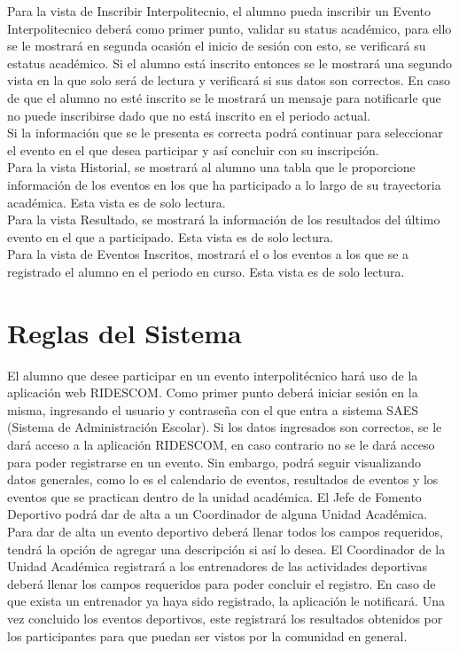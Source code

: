 	Para la vista de Inscribir Interpolitecnio, el alumno pueda inscribir un Evento Interpolitecnico deberá como primer punto, validar su status académico, para ello se le mostrará en segunda ocasión el inicio de sesión con esto, se verificará su estatus académico. Si el alumno está inscrito entonces se le mostrará una segundo vista en la que solo será de lectura y verificará si sus datos son correctos. En caso de que el alumno no esté inscrito se le mostrará un mensaje para notificarle que no puede inscribirse dado que no está inscrito en el periodo actual. \\
	Si la información que se le presenta es correcta podrá continuar para seleccionar el evento en el que desea participar y así concluir con su inscripción. \\
	
	Para la vista Historial, se mostrará al alumno una tabla que le proporcione información de los eventos en los que ha participado a lo largo de su trayectoria académica. Esta vista es de solo lectura.\\
	
	Para la vista Resultado, se mostrará la información de los resultados del último evento en el que a participado. Esta vista es de solo lectura.\\
	
	Para la vista de Eventos Inscritos, mostrará el o los eventos a los que se a registrado el alumno en el periodo en curso. Esta vista es de solo lectura.\\
	
	
	\section{Reglas del Sistema}
	\noindent El alumno que desee participar en un evento interpolitécnico hará uso de la aplicación web RIDESCOM. Como primer punto deberá iniciar sesión en la misma, ingresando el usuario y contraseña con el que entra a sistema SAES (Sistema de Administración Escolar). Si los datos ingresados son correctos, se le dará acceso a la aplicación RIDESCOM, en caso contrario no se le dará acceso para poder registrarse en un evento. Sin embargo, podrá seguir visualizando datos generales, como lo es el calendario de eventos, resultados de eventos y los eventos que se practican dentro de la unidad académica.
	El Jefe de Fomento Deportivo podrá dar de alta a un Coordinador de alguna Unidad Académica. Para dar de alta un evento deportivo deberá llenar todos los campos requeridos, tendrá la opción de agregar una descripción si así lo desea. 
	El Coordinador de la Unidad Académica registrará a los entrenadores de las actividades deportivas deberá llenar los campos requeridos para poder concluir el registro. En caso de que exista un entrenador ya haya sido registrado, la aplicación le notificará. Una vez concluido los eventos deportivos, este registrará los resultados obtenidos por los participantes para que puedan ser vistos por la comunidad en general.
	

